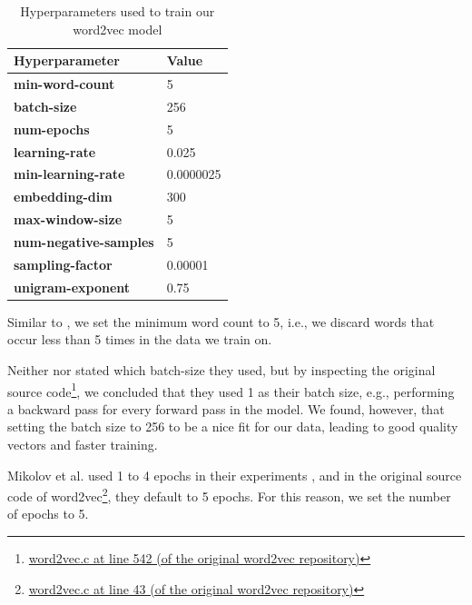 \begin{table}[ht]
    \centering
    \begin{tabular}{@{}ll@{}}
    \toprule
    Hyperparameter & Value\\
    \midrule
    \rowcolor[HTML]{F5F5F5} \textbf{min-word-count} & 5\\
    \textbf{batch-size} & 256\\
    \rowcolor[HTML]{F5F5F5} \textbf{num-epochs} & 5\\
    \textbf{learning-rate} & 0.025\\
    \rowcolor[HTML]{F5F5F5} \textbf{min-learning-rate} & 0.0000025\\
    \textbf{embedding-dim} & 300\\
    \rowcolor[HTML]{F5F5F5} \textbf{max-window-size} & 5\\
    \textbf{num-negative-samples} & 5\\
    \rowcolor[HTML]{F5F5F5} \textbf{sampling-factor} & 0.00001\\
    \textbf{unigram-exponent} & 0.75\\
    \bottomrule
    \end{tabular}
    \caption{Hyperparameters used to train our word2vec model}
    \label{table:word2vec-hyperparameter-choices}
\end{table}

Similar to \cite{mikolov2013b}, we set the minimum word count to 5, i.e., we discard words that occur less than 5 times in the data we train on.

Neither \cite{mikolov2013a} nor \cite{mikolov2013b} stated which batch-size they used, but by inspecting the original source code\footnote{\href{https://github.com/tmikolov/word2vec/blob/e092540633572b883e25b367938b0cca2cf3c0e7/word2vec.c/#L542}{word2vec.c at line 542 (of the original word2vec repository)}}, we concluded that they used 1 as their batch size, e.g., performing a backward pass for every forward pass in the model. We found, however, that setting the batch size to 256 to be a nice fit for our data, leading to good quality vectors and faster training.

Mikolov et al. used 1 to 4 epochs in their experiments \cite{mikolov2013a, mikolov2013b}, and in the original source code of word2vec\footnote{\href{https://github.com/tmikolov/word2vec/blob/e092540633572b883e25b367938b0cca2cf3c0e7/word2vec.c/#L43}{word2vec.c at line 43 (of the original word2vec repository)}}, they default to 5 epochs. For this reason, we set the number of epochs to 5.

